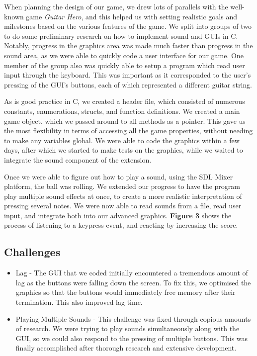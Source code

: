 \documentclass[11pt]{article}
\begin{document}
When planning the design of our game, we drew lots of parallels with the well-known game \emph{Guitar Hero}, and this helped us with setting realistic goals and milestones based on the various features of the game. We split into groups of two to do some preliminary research on how to implement sound and GUIs in C. Notably, progress in the graphics area was made much faster than progress in the sound area, as we were able to quickly code a user interface for our game. One member of the group also was quickly able to setup a program which read user input through the keyboard. This was important as it corresponded to the user's pressing of the GUI's buttons, each of which represented a different guitar string.

\vspace{0.2in}

As is good practice in C, we created a header file, which consisted of numerous constants, enumerations, structs, and function definitions. We created a main game object, which we passed around to all methods as a pointer. This gave us the most flexibility in terms of accessing all the game properties, without needing to make any variables global. We were able to code the graphics within a few days, after which we started to make tests on the graphics, while we waited to integrate the sound component of the extension.

\vspace{0.2in}

Once we were able to figure out how to play a sound, using the SDL Mixer platform, the ball was rolling. We extended our progress to have the program play multiple sound effects at once, to create a more realistic interpretation of pressing several notes. We were now able to read sounds from a file, read user input, and integrate both into our advanced graphics. \textbf{Figure 3} shows the process of listening to a keypress event, and reacting by increasing the score.

\subsection{Challenges}

\begin{itemize}

\item Lag - The GUI that we coded initially encountered a tremendous amount of lag as the buttons were falling down the screen. To fix this, we optimised the graphics so that the buttons would immediately free memory after their termination. This also improved lag time.

\item Playing Multiple Sounds - This challenge was fixed through copious amounts of research. We were trying to play sounds simultaneously along with the GUI, so we could also respond to the pressing of multiple buttons. This was finally accomplished after thorough research and extensive development.

\end{itemize}
\end{document}
